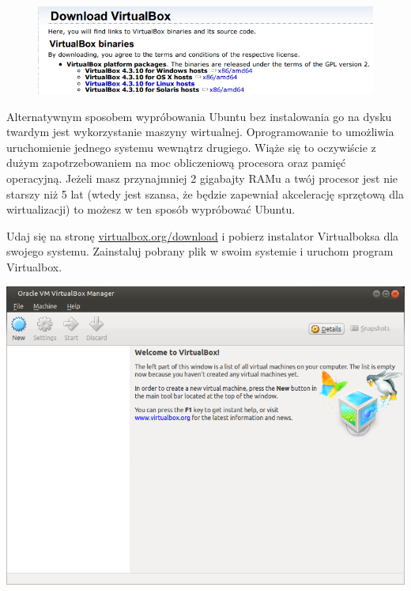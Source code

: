 \begin{figure}
                \includegraphics[width=\linewidth]{images/virtualbox_download.png}
\end{figure}

Alternatywnym sposobem wypróbowania Ubuntu bez instalowania go na dysku twardym jest wykorzystanie maszyny wirtualnej. Oprogramowanie to umożliwia uruchomienie jednego systemu wewnątrz drugiego. Wiąże się to oczywiście z dużym zapotrzebowaniem na moc obliczeniową procesora oraz pamięć operacyjną. Jeżeli masz przynajmniej 2 gigabajty RAMu a twój procesor jest nie starszy niż 5 lat (wtedy jest szansa, że będzie zapewniał akcelerację sprzętową dla wirtualizacji) to możesz w ten sposób wypróbować Ubuntu.

Udaj się na stronę \href{https://www.virtualbox.org/wiki/Downloads}{virtualbox.org/download} i pobierz instalator Virtualboksa dla swojego systemu. Zainstaluj pobrany plik w swoim systemie i uruchom program Virtualbox.
\clearpage
\begin{center}
        \includegraphics[scale=0.7]{images/virtualbox_main.png}
\end{center}

